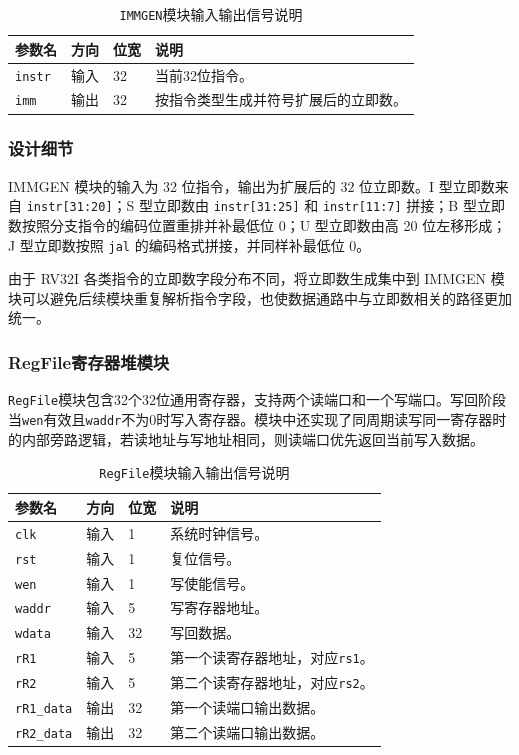 \documentclass[12pt,a4paper]{ctexart}
\newcommand{\code}[1]{\texttt{#1}}
\begin{document}
\begin{table}[H]
\centering
\caption{\code{IMMGEN}模块输入输出信号说明}
\footnotesize
\renewcommand{\arraystretch}{1.15}
\begin{tabularx}{\textwidth}{p{3.2cm}p{1.5cm}p{2.1cm}X}
\toprule
参数名 & 方向 & 位宽 & 说明 \\
\midrule
\code{instr} & 输入 & 32 & 当前32位指令。 \\
\code{imm} & 输出 & 32 & 按指令类型生成并符号扩展后的立即数。 \\
\bottomrule
\end{tabularx}
\end{table}

\subsubsection*{设计细节}

IMMGEN 模块的输入为 32 位指令，输出为扩展后的 32 位立即数。I 型立即数来自 \code{instr[31:20]}；S 型立即数由 \code{instr[31:25]} 和 \code{instr[11:7]} 拼接；B 型立即数按照分支指令的编码位置重排并补最低位 0；U 型立即数由高 20 位左移形成；J 型立即数按照 \code{jal} 的编码格式拼接，并同样补最低位 0。

由于 RV32I 各类指令的立即数字段分布不同，将立即数生成集中到 IMMGEN 模块可以避免后续模块重复解析指令字段，也使数据通路中与立即数相关的路径更加统一。

\subsubsection{RegFile寄存器堆模块}

\code{RegFile}模块包含32个32位通用寄存器，支持两个读端口和一个写端口。写回阶段当\code{wen}有效且\code{waddr}不为0时写入寄存器。模块中还实现了同周期读写同一寄存器时的内部旁路逻辑，若读地址与写地址相同，则读端口优先返回当前写入数据。

\begin{table}[H]
\centering
\caption{\code{RegFile}模块输入输出信号说明}
\footnotesize
\renewcommand{\arraystretch}{1.15}
\begin{tabularx}{\textwidth}{p{3.2cm}p{1.5cm}p{2.1cm}X}
\toprule
参数名 & 方向 & 位宽 & 说明 \\
\midrule
\code{clk} & 输入 & 1 & 系统时钟信号。 \\
\code{rst} & 输入 & 1 & 复位信号。 \\
\code{wen} & 输入 & 1 & 写使能信号。 \\
\code{waddr} & 输入 & 5 & 写寄存器地址。 \\
\code{wdata} & 输入 & 32 & 写回数据。 \\
\code{rR1} & 输入 & 5 & 第一个读寄存器地址，对应\code{rs1}。 \\
\code{rR2} & 输入 & 5 & 第二个读寄存器地址，对应\code{rs2}。 \\
\code{rR1\_data} & 输出 & 32 & 第一个读端口输出数据。 \\
\code{rR2\_data} & 输出 & 32 & 第二个读端口输出数据。 \\
\bottomrule
\end{tabularx}
\end{table}
\end{document}

